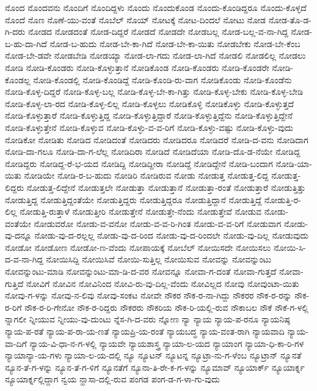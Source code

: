 {ನೊಂದ
ನೊಂದವನು
ನೊಂದಿಗೆ
ನೊಂದಿದ್ದಳು
ನೊಂದು
ನೊಂದುಕೊಂಡ
ನೊಂದು-ಕೊಂಡಿದ್ದರೂ
ನೊಂದು-ಕೊಳ್ಳದೆ
ನೊಂದೆ
ನೊಣ
ನೊಣೆ-ಯು-ವಂತೆ
ನೊಬೆಲ್
ನೊಯ್
ನೋಟಕ್ಕೆ
ನೋಟ-ದಿಂದಲೆ
ನೋಟು
ನೋಡ
ನೋಡ-ತೊ-ಡ-ಗಿ-ದರು
ನೋಡದ
ನೋಡದಂತೆ
ನೋಡ-ದಿದ್ದರೆ
ನೋಡದೆ
ನೋಡದೇ
ನೋಡಬಲ್ಲ
ನೋಡ-ಬಲ್ಲ-ವ-ನಾ-ಗಿದ್ದ
ನೋಡ-ಬ-ಹು-ದಾ-ಗಿದೆ
ನೋಡ-ಬ-ಹುದು
ನೋಡ-ಬೇ-ಕಾ-ಗಿದೆ
ನೋಡ-ಬೇ-ಕಾ-ಯಿತು
ನೋಡಬೇಕು
ನೋಡ-ಬೇ-ಕೆಂಬ
ನೋಡ-ಬೇ-ಡವೇ
ನೋಡಬೇಡಿ
ನೋಡಯ್ಯಾ
ನೋಡ-ಲಾ-ಗದು
ನೋಡ-ಲಾ-ಗಿದೆ
ನೋಡಲಿ
ನೋಡಲಿಲ್ಲ
ನೋಡಲು
ನೋಡಿ
ನೋಡಿ-ಕೊಂಡರು
ನೋಡಿ-ಕೊಳ್ಳುತ್ತಾನೆ
ನೋಡಿಕೊಂಡ
ನೋಡಿ-ಕೊಂಡರು
ನೋಡಿ-ಕೊಂಡರೇ
ನೋಡಿ-ಕೊಂಡಲ್ಲ
ನೋಡಿ-ಕೊಂಡಲ್ಲಿ
ನೋಡಿ-ಕೊಂಡಿದ್ದೆ
ನೋಡಿ-ಕೊಂಡಿ-ರು-ವಾಗ
ನೋಡಿಕೊಂಡು
ನೋಡಿ-ಕೊಂಡೆನು
ನೋಡಿ-ಕೊಳ್ಳ-ದಿದ್ದರೆ
ನೋಡಿ-ಕೊಳ್ಳ-ಬಲ್ಲ
ನೋಡಿ-ಕೊಳ್ಳ-ಬೇ-ಕಾ-ಗಿತ್ತು
ನೋಡಿ-ಕೊಳ್ಳ-ಬೇಕು
ನೋಡಿ-ಕೊಳ್ಳ-ಬೇಡಿ
ನೋಡಿ-ಕೊಳ್ಳ-ಲಾ-ರದ
ನೋಡಿ-ಕೊಳ್ಳ-ಲಿಲ್ಲ
ನೋಡಿ-ಕೊಳ್ಳಲು
ನೋಡಿಕೊಳ್ಳಿ
ನೋಡಿಕೊಳ್ಳು
ನೋಡಿ-ಕೊಳ್ಳುತ್ತದೆ
ನೋಡಿ-ಕೊಳ್ಳುತ್ತಾರೆ
ನೋಡಿ-ಕೊಳ್ಳುತ್ತಿದ್ದ
ನೋಡಿ-ಕೊಳ್ಳುತ್ತಿದ್ದಾರೆ
ನೋಡಿ-ಕೊಳ್ಳುತ್ತಿದ್ದೆನು
ನೋಡಿ-ಕೊಳ್ಳುತ್ತಿದ್ದೇನೆ
ನೋಡಿ-ಕೊಳ್ಳುತ್ತೇನೆ
ನೋಡಿ-ಕೊಳ್ಳುವ
ನೋಡಿ-ಕೊಳ್ಳು-ವ-ವ-ರಿಗೆ
ನೋಡಿ-ಕೊಳ್ಳು-ವಷ್ಟು
ನೋಡಿ-ಕೊಳ್ಳು-ವುದು
ನೋಡಿಕೋ
ನೋಡಿತು
ನೋಡಿದ
ನೋಡಿದಂತೆ
ನೋಡಿದರು
ನೋಡಿದರೂ
ನೋಡಿದರೆ
ನೋಡಿ-ದ-ವನು
ನೋಡಿದಾಗ
ನೋಡಿ-ದಾ-ಗಲೂ
ನೋಡಿ-ದಾ-ಗ-ಲೆಲ್ಲ
ನೋಡಿದಿರಾ
ನೋಡಿದೆ
ನೋಡಿದೆಯಾ
ನೋಡಿ-ದೊ-ಡ-ನೆಯೇ
ನೋಡಿದ್ದ
ನೋಡಿದ್ದರು
ನೋಡಿದ್ದ-ರೆ-ಭ-ಯದ
ನೋಡಿದ್ದಿ
ನೋಡಿದ್ದೀರಾ
ನೋಡಿದ್ದೆ
ನೋಡಿದ್ದೇನೆ
ನೋಡಿ-ಬಂದಾಗ
ನೋಡಿ-ಯಾ-ಯಿತು
ನೋಡಿಯೇ
ನೋಡಿ-ರ-ಬ-ಹುದು
ನೋಡಿರಿ
ನೋಡಿರುವ
ನೋಡು
ನೋಡುತ್ತ
ನೋಡುತ್ತ-ಲಿದ್ದ
ನೋಡುತ್ತ-ಲಿದ್ದರು
ನೋಡುತ್ತ-ಲಿದ್ದೇನೆ
ನೋಡುತ್ತಲೇ
ನೋಡುತ್ತಾ
ನೋಡುತ್ತಾನೆ
ನೋಡುತ್ತಾ-ರಂತೆ
ನೋಡುತ್ತಾರೆ
ನೋಡುತ್ತಿತ್ತು
ನೋಡುತ್ತಿದ್ದ
ನೋಡುತ್ತಿದ್ದಂತೆಯೇ
ನೋಡುತ್ತಿದ್ದರು
ನೋಡುತ್ತಿದ್ದರೂ
ನೋಡುತ್ತಿದ್ದಾನೆ
ನೋಡುತ್ತಿದ್ದೆ
ನೋಡುತ್ತಿ-ರ-ಲಿಲ್ಲ
ನೋಡುತ್ತಿ-ರುತ್ತಾಳೆ
ನೋಡುತ್ತೀರಿ
ನೋಡುತ್ತೇನೆ
ನೋಡುತ್ತೇ-ನೆಂದು
ನೋಡುತ್ತೇವೆ
ನೋಡುವ
ನೋಡು-ವಂತೆಯೇ
ನೋಡುವರೋ
ನೋಡು-ವ-ವನೋ
ನೋಡು-ವ-ವ-ರಿ-ಗಿಂತ
ನೋಡು-ವ-ವ-ರಿಗೆ
ನೋಡುವಾಗ
ನೋಡು-ವು-ದನ್ನೂ
ನೋಡು-ವು-ದ-ರಲ್ಲಲ್ಲ
ನೋಡು-ವು-ದ-ರಿಂದ
ನೋಡು-ವು-ದ-ರಿಂದಲೇ
ನೋಡು-ವು-ದಿಲ್ಲ
ನೋಡುವುದು
ನೋಡೋ
ನೋಡೋಣ
ನೋಡೋ-ಣ-ವೆಂದು
ನೋಪಾಯಕ್ಕೆ
ನೋಬೆಲ್
ನೋಯಿಸದೇ
ನೋಯಿಸಲು
ನೋಯಿ-ಸಿ-ದ-ವ-ನಾ-ಗಿದ್ದ
ನೋಯಿಸಿದ್ದಿ
ನೋಯಿಸಿವೆ
ನೋಯಿ-ಸುತ್ತಿಲ್ಲ
ನೋಯಿಸುವ
ನೋವನ್ನು
ನೋವನ್ನುಂಟು
ನೋವನ್ನುಂಟು-ಮಾಡಿ
ನೋವನ್ನುಂಟು-ಮಾ-ಡಿ-ದ-ವರ
ನೋವನ್ನೂ
ನೋವಾ-ಗ-ದಂತೆ
ನೋವಾ-ಗುತ್ತದೆ
ನೋವಾ-ಗುತ್ತಿದೆ
ನೋವಿಗೆ
ನೋವಿನ
ನೋವಿನಿಂದ
ನೋವಿ-ರು-ವು-ದಿಲ್ಲ-ವೆಂದು
ನೋವಿಲ್ಲದ
ನೋವು
ನೋವುಂಟಾ-ಯಿತು
ನೋವು-ಗ-ಳನ್ನು
ನೋವು-ನ-ಲಿವು
ನೋವು-ಸಂಕಟ
ನೋವೇ
ನೌಕರ
ನೌಕ-ರ-ನಾ-ಗಿದ್ದು
ನೌಕರರ
ನೌಕ-ರ-ರನ್ನು
ನೌಕ-ರ-ರಿಗೆ
ನೌಕ-ರ-ರಿ-ಗೇನೋ
ನೌಕ-ರ-ರಿದ್ದರು
ನೌಕರರು
ನೌಕರಿಯ
ನೌಕ-ರಿ-ಯಲ್ಲಿ-ರುವ
ನೌಕಾಬಲ
ನೌಕೆ
ನೌಕೆ-ಗ-ಳಲ್ಲಿ
ನ್ನಾಗಲೀ
ನ್ನೀಯುವ
ನ್ನೀಯು-ವು-ದುಂಟು
ನ್ನೆಸ-ಗಿ-ದ-ವರು
ನ್ನೋಣ
ನ್ಯಾ
ನ್ಯಾಯ
ನ್ಯಾಯ-ಪ-ರನೂ
ನ್ಯಾಯನಿಷ್ಠ
ನ್ಯಾಯ-ಪ-ರತೆ
ನ್ಯಾಯ-ಪ-ರಾ-ಯ-ಣತೆ
ನ್ಯಾಯಪ್ರಿ-ಯ-ರಂತೆ
ನ್ಯಾಯಬದ್ಧ
ನ್ಯಾಯ-ವಂತ-ರಾಗಿ
ನ್ಯಾಯವಾದಿ
ನ್ಯಾಯ-ವಾ-ದಿಗೆ
ನ್ಯಾಯ-ವಿ-ಧಾ-ನ-ಗ-ಳಲ್ಲಿ
ನ್ಯಾಯವೇ
ನ್ಯಾಯಶಾಸ್ತ್ರ
ನ್ಯಾಯಾ-ಲ-ಯದ
ನ್ಯಾಯಾಂಗ
ನ್ಯಾಯಾ-ಧಿ-ಕಾ-ರಿ-ಗಳ
ನ್ಯಾಯಾನ್ಯಾ-ಯ-ಗಳು
ನ್ಯಾಯಾ-ಲ-ಯ-ದಲ್ಲಿ
ನ್ಯೂ
ನ್ಯೂಟನ್
ನ್ಯೂಟನ್ನ
ನ್ಯೂಟ್ರಾ-ನು-ಗ-ಳೆಂಬ
ನ್ಯೂಟ್ರಾನ್
ನ್ಯೂನತೆ
ನ್ಯೂನ-ತೆ-ಗ-ಳನ್ನು
ನ್ಯೂನ-ತೆ-ಗ-ಳಿಗೆ
ನ್ಯೂನತೆಗೆ
ನ್ಯೂನಾ-ತಿ-ರೇ-ಕ-ಗ-ಳನ್ನು
ನ್ಯೂಮಾವ್
ನ್ಯೂಯಾರ್ಕ್
ನ್ಯೂಯಾರ್ಕ್ನ
ನ್ಯೂಯಾರ್ಕ್ನಲ್ಲಿದ್ದಾಗ
ನ್ವಯ
ನ್ಹಾಸಾ-ದಲ್ಲಿ-ರುವ
ಪಂಗಡ
ಪಂಗ-ಡ-ಗ-ಳಾ-ಗು-ವುದು
}
